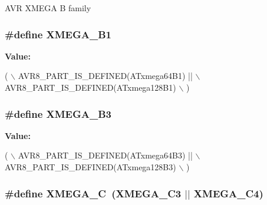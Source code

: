 A\-V\-R X\-M\-E\-G\-A B family \hypertarget{group__xmega__part__macros__group_gaa2fd55860a1bbc05c6d0d384e7476596}{
\subsubsection[{X\-M\-E\-G\-A\-\_\-\-B1}]{\setlength{\rightskip}{0pt plus 5cm}\#define X\-M\-E\-G\-A\-\_\-\-B1}}\label{group__xmega__part__macros__group_gaa2fd55860a1bbc05c6d0d384e7476596}
{\bfseries Value\-:}
\begin{DoxyCode}
( \(\backslash\)
                AVR8\_PART\_IS\_DEFINED(ATxmega64B1)  || \(\backslash\)
                AVR8\_PART\_IS\_DEFINED(ATxmega128B1) \(\backslash\)
                )
\end{DoxyCode}
\hypertarget{group__xmega__part__macros__group_ga7385be70af05a3a61864a4fc470fa39d}{
\subsubsection[{X\-M\-E\-G\-A\-\_\-\-B3}]{\setlength{\rightskip}{0pt plus 5cm}\#define X\-M\-E\-G\-A\-\_\-\-B3}}\label{group__xmega__part__macros__group_ga7385be70af05a3a61864a4fc470fa39d}
{\bfseries Value\-:}
\begin{DoxyCode}
( \(\backslash\)
                AVR8\_PART\_IS\_DEFINED(ATxmega64B3)  || \(\backslash\)
                AVR8\_PART\_IS\_DEFINED(ATxmega128B3) \(\backslash\)
                )
\end{DoxyCode}
\hypertarget{group__xmega__part__macros__group_ga75b06dd59d29b1de54dd73fe67830973}{
\subsubsection[{X\-M\-E\-G\-A\-\_\-\-C}]{\setlength{\rightskip}{0pt plus 5cm}\#define X\-M\-E\-G\-A\-\_\-\-C~(X\-M\-E\-G\-A\-\_\-\-C3 $|$$|$ X\-M\-E\-G\-A\-\_\-\-C4)}}\label{group__xmega__part__macros__group_ga75b06dd59d29b1de54dd73fe67830973}
